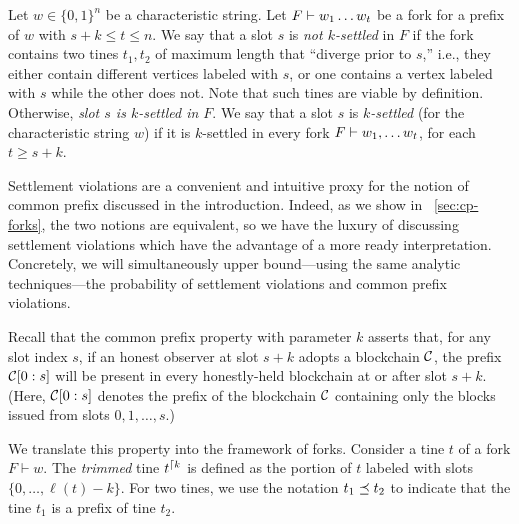 \begin{definition}\label{def:settlement}
  Let $w \in \{0,1\}^n$ be a characteristic string. Let
  $F \vdash w_1 \ldots w_t$ be a fork for a prefix of $w$ with
  $s + k \leq t \leq n$.  We say that a slot $s$ is \emph{not
    $k$-settled} in $F$ if the fork contains two tines $t_1, t_2$ of
  maximum length that ``diverge prior to $s$,'' i.e., they either
  contain different vertices labeled with $s$, or one contains a
  vertex labeled with $s$ while the other does not. Note that such
  tines are viable by definition.
  Otherwise, \emph{slot $s$ is $k$-settled in $F$}. We say that a slot
  $s$ is \emph{$k$-settled} (for the characteristic string $w$) if it
  is $k$-settled in every fork $F \vdash w_1, \ldots w_t$, for each
  $t \geq s+k$.
\end{definition}

 Settlement violations are a convenient and
intuitive proxy for the notion of common prefix discussed in the
introduction. Indeed, as we show in \Section~\ref{sec:cp-forks}, the
two notions are equivalent, so we have the luxury of discussing
settlement violations which have the advantage of a more ready
interpretation. Concretely, we will simultaneously upper bound---using
the same analytic techniques---the probability of settlement
violations and common prefix violations.

Recall that the common prefix property with parameter $k$ asserts
that, for any slot index $s$, if an honest observer at slot $s + k$
adopts a blockchain $\mathcal{C}$, the prefix $\mathcal{C}[0 : s]$ will be
present in every honestly-held blockchain at or after slot $s + k$.
(Here, $\mathcal{C}[0 : s]$ denotes the prefix of the blockchain $\mathcal{C}$
containing only the blocks issued from slots $0, 1, \ldots, s$.)

We translate this property into the framework of forks.  Consider a
tine $t$ of a fork $F \vdash w$.  The \emph{trimmed} tine
$t^{\lceil {k}}$ is defined as the portion of $t$ labeled with slots
$\{ 0, \ldots, \ell(t) - k\}$. For two tines, we use the notation
$t_1 \preceq t_2$ to indicate that the tine $t_1$ is a
prefix of tine $t_2$.

